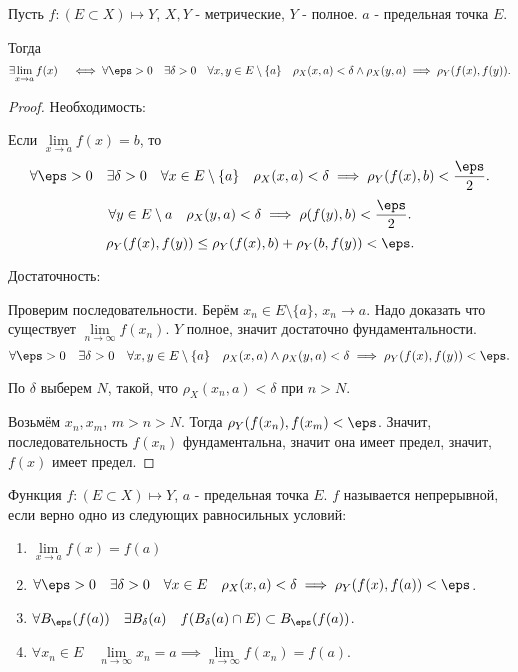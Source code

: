 \begin{theorem} \thmslashn

    Пусть $f : (E \subset X) \mapsto Y$, $X,Y$ - метрические, $Y$ - полное. $a$ - предельная точка $E$.

    Тогда
    \[ \exists{\lim\limits_{x \to a} f(x)}\quad \iff \forall{\eps > 0}\quad \exists{\delta > 0}\quad \forall{x, y\in E \setminus \{a\} }\quad \rho_{X}(x,a) < \delta \land \rho_{X}(y, a) \implies \rho_{Y}(f(x), f(y)) .\]
    \begin{proof}
        Необходимость:
        
        Если $\lim\limits_{x \to a} f(x) = b$, то 
        \[ \forall{\eps > 0}\quad \exists{\delta > 0}\quad \forall{x\in E \setminus \{a\} }\quad \rho_{X}(x, a) < \delta \implies \rho_{Y}(f(x), b) < \frac{\eps}{2} .\]
        \[ \forall{y\in E \setminus a}\quad \rho_{X}(y, a) < \delta \implies \rho(f(y), b) < \frac{\eps}{2} .\]
        \[ \rho_{Y}(f(x), f(y)) \le \rho_{Y}(f(x), b) + \rho_{Y}(b, f(y)) < \eps .\]

        Достаточность:

        Проверим последовательности. Берём $x_{n}\in E \setminus \{a\} $, $x_{n} \to a$. Надо доказать что существует $\lim\limits_{n \to \infty} f(x_{n})$. $Y$ полное, значит достаточно фундаментальности.
        \[ \forall{\eps > 0}\quad \exists{\delta > 0}\quad \forall{x, y\in E \setminus \{a\} }\quad \rho_{X}(x, a)\land \rho_{X}(y, a) < \delta \implies \rho_{Y}(f(x), f(y)) < \eps  .\]

        По $\delta$ выберем $N$, такой, что $\rho_{X}(x_{n}, a) < \delta$ при $n > N$. 

        Возьмём $x_{n}, x_{m}$, $m > n > N$. Тогда $\rho_{Y}(f(x_{n}), f(x_{m}) < \eps$. Значит, последовательность $f(x_{n})$ фундаментальна, значит она имеет предел, значит, $f(x)$ имеет предел.
    \end{proof}
\end{theorem}
\begin{definition} \thmslashn 

    Функция $f : (E \subset X) \mapsto Y$, $a$ - предельная точка $E$. $f$ называется непрерывной, если верно одно из следующих равносильных условий:
    \begin{enumerate}
        \item $\lim\limits_{x \to a} f(x) = f(a)$
        \item $\forall{\eps > 0}\quad \exists{\delta > 0}\quad \forall{x\in E}\quad \rho_{X}(x, a) < \delta \implies \rho_{Y}(f(x), f(a)) < \eps$.
        \item $\forall{B_{\eps}(f(a))}\quad \exists{B_{\delta}(a)}\quad f(B_{\delta}(a)\cap E) \subset B_{\eps}(f(a))$.
        \item $\forall{x_{n}\in E}\quad \lim\limits_{n \to \infty} x_{n} = a \implies \lim\limits_{n \to \infty} f(x_{n}) = f(a)$.
    \end{enumerate}
\end{definition}
